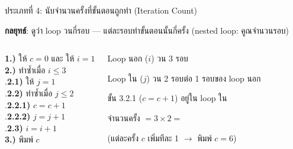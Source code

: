 \documentclass[11pt, aspectratio=169]{beamer}
\begin{document}
\begin{frame}{ประเภทที่ 4: นับจำนวนครั้งที่ขั้นตอนถูกทำ (Iteration Count)}
  \begin{explanation}
    \textbf{กลยุทธ์}: ดูว่า loop วนกี่รอบ — แต่ละรอบทำขั้นตอนนั้นกี่ครั้ง
    (nested loop: คูณจำนวนรอบ)
  \end{explanation}

  \begin{columns}[T]
      \begin{pseudobox}
        \textbf{1.)} ให้ $c = 0$ และ ให้ $i = 1$ \\
        \textbf{2.)} ทำซํ้าเมื่อ $i \leq 3$ \\
        .\qquad \textbf{2.1)} ให้ $j = 1$ \\
        .\qquad \textbf{2.2)} ทำซํ้าเมื่อ $j \leq 2$ \\
        .\qquad\quad \textbf{2.2.1)} $c = c + 1$ \\
        .\qquad\quad \textbf{2.2.2)} $j = j + 1$ \\
        .\qquad \textbf{2.3)} $i = i + 1$ \\
        \textbf{3.)} พิมพ์ $c$
      \end{pseudobox}
      \begin{solbox}[ขั้น 2.2.1 ถูกทำกี่ครั้ง?]
        Loop นอก ($i$) วน 3 รอบ

        Loop ใน ($j$) วน 2 รอบต่อ 1 รอบของ loop นอก

        ขั้น 3.2.1 ($c = c+1$) อยู่ใน loop ใน

        จำนวนครั้ง $= 3 \times 2 =$ 

        \medskip
        (แต่ละครั้ง $c$ เพิ่มทีละ 1 $\rightarrow$ พิมพ์ $c = 6$)
      \end{solbox}
  \end{columns}
\end{frame}
\end{document}
